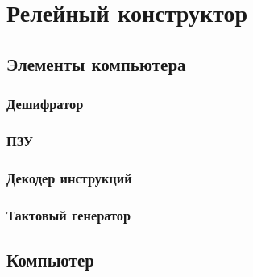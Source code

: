 \documentclass[openany]{book}
\begin{document}
\tableofcontents

\part{Релейный конструктор}









\chapter{Элементы компьютера}

\section{Дешифратор}

\section{ПЗУ}

\section{Декодер инструкций}

\section{Тактовый генератор}


\chapter{Компьютер}
\end{document}
